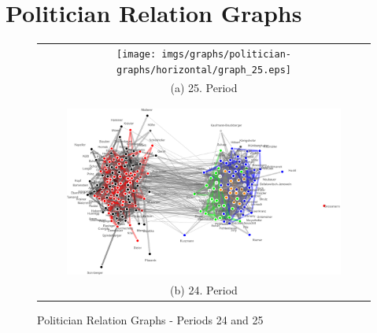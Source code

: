 \section{Politician Relation Graphs}

\begin{figure}
\center
\begin{tabular}{ c }
	\texttt{[image: imgs/graphs/politician-graphs/horizontal/graph\_25.eps]}
	\\
	(a) 25. Period
	\\
	\\
	\hline
	\\
	\includegraphics[width=0.85\textwidth]{imgs/graphs/politician-graphs/horizontal/graph_24.eps}
	\\
	(b) 24. Period
	
\end{tabular}
	
	
	\caption{Politician Relation Graphs - Periods 24 and 25}
	\label{fig:pol_graphs_24_25}
\end{figure}

